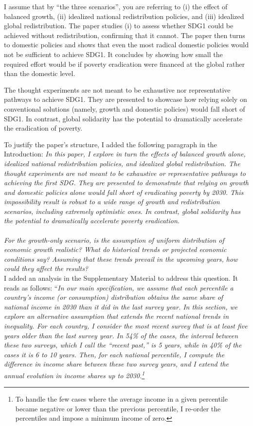 \documentclass[12pt,english]{article}
\begin{document}
I assume that by ``the three scenarios'', you are referring to (i) the effect of balanced growth, (ii) idealized national redistribution policies, and (iii) idealized global redistribution. The paper studies (i) to assess whether SDG1 could be achieved without redistribution, confirming that it cannot. The paper then turns to domestic policies and shows that even the most radical domestic policies would not be sufficient to achieve SDG1. It concludes by showing how small the required effort would be if poverty eradication were financed at the global rather than the domestic level. 

The thought experiments are not meant to be exhaustive nor representative pathways to achieve SDG1. They are presented to showcase how relying solely on conventional solutions (namely, growth and domestic policies) would fall short of SDG1. In contrast, global solidarity has the potential to dramatically accelerate the eradication of poverty.

To justify the paper's structure, I added the following paragraph in the Introduction: \textit{In this paper, I explore in turn the effects of balanced growth alone, idealized national redistribution policies, and idealized global redistribution. The thought experiments are not meant to be exhaustive or representative pathways to achieving the first SDG. They are presented to demonstrate that relying on growth and domestic policies alone would fall short of eradicating poverty by 2030. This impossibility result is robust to a wide range of growth and redistribution scenarios, including extremely optimistic ones. In contrast, global solidarity has the potential to dramatically accelerate poverty eradication.}
~\\ ~\\

\textit{For the growth-only scenario, is the assumption of uniform distribution of economic growth realistic? What do historical trends or projected economic conditions say? Assuming that these trends prevail in the upcoming years, how could they affect the results? }~\\

I added an analysis in the Supplementary Material to address this question. It reads as follows: ``\textit{In our main specification, we assume that each percentile a country's income (or consumption) distribution obtains the same share of national income in 2030 than it did in the last survey year. In this section, we explore an alternative assumption that extends the recent national trends in inequality. For each country, I consider the most recent survey that is at least five years older than the last survey year. In 54\% of the cases, the interval between these two surveys, which I call the ``recent past,'' is 5 years, while in 40\% of the cases it is 6 to 10 years. Then, for each national percentile, I compute the difference in income share between these two survey years, and I extend the annual evolution in income shares up to 2030.\footnote{To handle the few cases where the average income in a given percentile became negative or lower than the previous percentile, I re-order the percentiles and impose a minimum income of zero.}}
\end{document}
